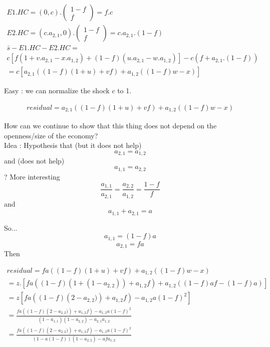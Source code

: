 \documentclass[11pt,a4paper]{article}
\begin{document}
\begin{gather*}
E1.HC = \left(0,c\right).\left(\begin{matrix}1-f\\f\end{matrix}\right)=f.c
\\
E2.HC=\left(c.a_{2,1},0\right).\left(\begin{matrix}1-f\\f\end{matrix}\right)=c.a_{2,1}.\left(1-f\right)
\\ 
\bar{s}-E1.HC-E2.HC=
\\
c\left[f\left(1+v.a_{2,1}-x.a_{1,2}\right)+\left(1-f\right)\left(u.a_{2,1}-w.a_{1,2}\right)\right]-c\left(f+a_{2,1}.\left(1-f\right)\right)
\\
=c\left[a_{2,1}\left(\left(1-f\right)\left(1+u\right)+vf\right)+a_{1,2}\left(\left(1-f\right)w-x\right)\right]
\end{gather*}

Easy : we can normalize the shock $c$ to 1. 

\begin{gather*}
residual=a_{2,1}\left(\left(1-f\right)\left(1+u\right)+vf\right)+a_{1,2}\left(\left(1-f\right)w-x\right)
\end{gather*}

How can we continue to show that this thing does not depend on the openness/size of the economy?
\\
 Idea : Hypothesis that (but it does not help) $$a_{2,1}=a_{1,2}$$ and (does not help)$$a_{1,1}=a_{2,2}$$ ? 
More interesting $$\frac{a_{1,1}}{a_{2,1}}=\frac{a_{2,2}}{a_{1,2}}=\frac{1-f}{f}$$ 
and 
$$a_{1,1}+a_{2,1}=a$$

So...
$$a_{1,1}=(1-f)a$$
$$a_{2,1}=fa$$
Then 

\begin{gather*}
residual=fa\left(\left(1-f\right)\left(1+u\right)+vf\right)+a_{1,2}\left(\left(1-f\right)w-x\right) \\
=z.\left[fa\left(\left(1-f\right)\left(1+(1-a_{2,2})\right)+a_{1,2}f\right)+a_{1,2}\left(\left(1-f\right)af-(1-f)a\right)\right] \\
= z\left[fa\left(\left(1-f\right)\left(2-a_{2,2})\right)+a_{1,2}f\right)-a_{1,2}a\left(1-f\right)^2\right] \\
= \frac{fa\left(\left(1-f\right)\left(2-a_{2,2})\right)+a_{1,2}f\right)-a_{1,2}a\left(1-f\right)^2}{\left(1-a_{1,1}\right)\left(1-a_{2,2}\right)-a_{2,1}a_{1,2}} \\
= \frac{fa\left(\left(1-f\right)\left(2-a_{2,2})\right)+a_{1,2}f\right)-a_{1,2}a\left(1-f\right)^2}{\left(1-a(1-f)\right)\left(1-a_{2,2}\right)-afa_{1,2}}
\end{gather*}
\end{document}
